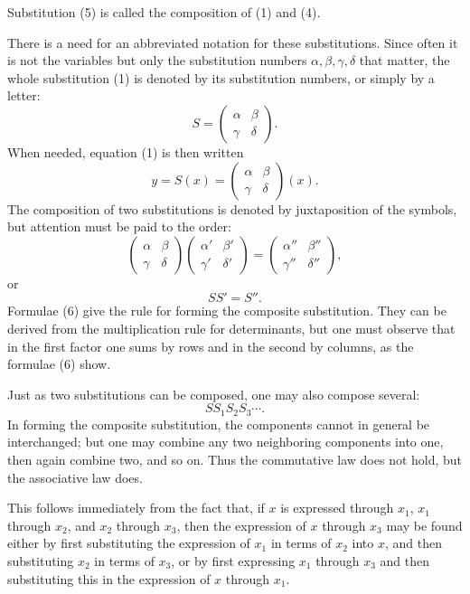 \documentclass[11pt]{article}
\begin{document}
Substitution (5) is called the composition of (1) and (4).

There is a need for an abbreviated notation for these substitutions. Since often it is not the variables but only the substitution numbers $\alpha,\beta,\gamma,\delta$ that matter, the whole substitution (1) is denoted by its substitution numbers, or simply by a letter:
\[
\tag{9}        S=\begin{pmatrix}\alpha&\beta\\ \gamma&\delta\end{pmatrix}.
\]
When needed, equation (1) is then written
\[
        y=S(x)=\begin{pmatrix}\alpha&\beta\\ \gamma&\delta\end{pmatrix}(x).
\]
The composition of two substitutions is denoted by juxtaposition of the symbols, but attention must be paid to the order:
\[
\tag{10}       \begin{pmatrix}\alpha&\beta\\ \gamma&\delta\end{pmatrix}
               \begin{pmatrix}\alpha'&\beta'\\ \gamma'&\delta'\end{pmatrix}
             = \begin{pmatrix}\alpha''&\beta''\\ \gamma''&\delta''\end{pmatrix},
\]
or
\[
\tag{11}       SS'=S''.
\]
Formulae (6) give the rule for forming the composite substitution. They can be derived from the multiplication rule for determinants, but one must observe that in the first factor one sums by rows and in the second by columns, as the formulae (6) show.

Just as two substitutions can be composed, one may also compose several:
\[
        SS_1S_2S_3\cdots.
\]
In forming the composite substitution, the components cannot in general be interchanged; but one may combine any two neighboring components into one, then again combine two, and so on. Thus the commutative law does not hold, but the associative law does.

This follows immediately from the fact that, if $x$ is expressed through $x_1$, $x_1$ through $x_2$, and $x_2$ through $x_3$, then the expression of $x$ through $x_3$ may be found either by first substituting the expression of $x_1$ in terms of $x_2$ into $x$, and then substituting $x_2$ in terms of $x_3$, or by first expressing $x_1$ through $x_3$ and then substituting this in the expression of $x$ through $x_1$.
\end{document}
